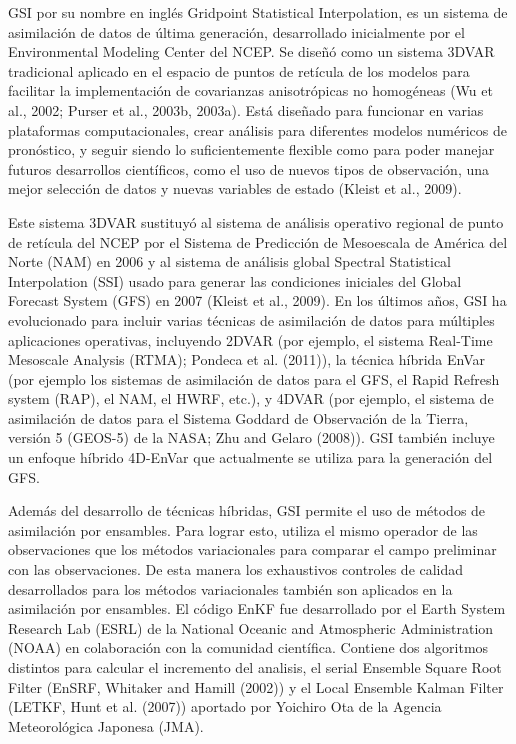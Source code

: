 \documentclass[12pt,oneside,a4paper]{reedthesis}
\begin{document}
GSI por su nombre en inglés Gridpoint Statistical Interpolation, es un sistema de asimilación de datos de última generación, desarrollado inicialmente por el Environmental Modeling Center del NCEP. Se diseñó como un sistema 3DVAR tradicional aplicado en el espacio de puntos de retícula de los modelos para facilitar la implementación de covarianzas anisotrópicas no homogéneas (Wu et al., 2002; Purser et al., 2003b, 2003a).
Está diseñado para funcionar en varias plataformas computacionales, crear análisis para diferentes modelos numéricos de pronóstico, y seguir siendo lo suficientemente flexible como para poder manejar futuros desarrollos científicos, como el uso de nuevos tipos de observación, una mejor selección de datos y nuevas variables de estado (Kleist et al., 2009).

Este sistema 3DVAR sustituyó al sistema de análisis operativo regional de punto de retícula del NCEP por el Sistema de Predicción de Mesoescala de América del Norte (NAM) en 2006 y al sistema de análisis global Spectral Statistical Interpolation (SSI) usado para generar las condiciones iniciales del Global Forecast System (GFS) en 2007 (Kleist et al., 2009).
En los últimos años, GSI ha evolucionado para incluir varias técnicas de asimilación de datos para múltiples aplicaciones operativas, incluyendo 2DVAR (por ejemplo, el sistema Real-Time Mesoscale Analysis (RTMA); Pondeca et al. (2011)), la técnica híbrida EnVar (por ejemplo los sistemas de asimilación de datos para el GFS, el Rapid Refresh system (RAP), el NAM, el HWRF, etc.), y 4DVAR (por ejemplo, el sistema de asimilación de datos para el Sistema Goddard de Observación de la Tierra, versión 5 (GEOS-5) de la NASA; Zhu and Gelaro (2008)).
GSI también incluye un enfoque híbrido 4D-EnVar que actualmente se utiliza para la generación del GFS.

Además del desarrollo de técnicas híbridas, GSI permite el uso de métodos de asimilación por ensambles. Para lograr esto, utiliza el mismo operador de las observaciones que los métodos variacionales para comparar el campo preliminar con las observaciones.
De esta manera los exhaustivos controles de calidad desarrollados para los métodos variacionales también son aplicados en la asimilación por ensambles.
El código EnKF fue desarrollado por el Earth System Research Lab (ESRL) de la National Oceanic and Atmospheric Administration (NOAA) en colaboración con la comunidad científica.
Contiene dos algoritmos distintos para calcular el incremento del analisis, el serial Ensemble Square Root Filter (EnSRF, Whitaker and Hamill (2002)) y el Local Ensemble Kalman Filter (LETKF, Hunt et al. (2007)) aportado por Yoichiro Ota de la Agencia Meteorológica Japonesa (JMA).
\end{document}
